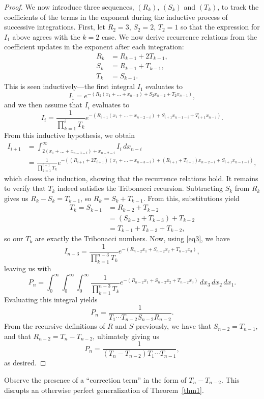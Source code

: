 \documentclass{amsart}
\begin{document}
\begin{proof}
  We now introduce three sequences, $(R_k)$, $(S_k)$ and $(T_k)$, to track the coefficients of the terms in the exponent during the inductive process of successive integrations. First, let $R_2=3$, $S_2=2$, $T_2=1$ so that the expression for $I_1$ above agrees with the $k=2$ case. We now derive recurrence relations from the coefficient updates in the exponent after each integration:
  \begin{align*}
    R_{k} &= R_{k-1} + 2T_{k-1}, \\
    S_k &= R_{k-1} + T_{k-1}, \\
    T_{k} &= S_{k-1}.
  \end{align*}
  This is seen inductively---the first integral $I_1$ evaluates to \[
    I_1 = e^{-(R_2(x_1 + \dots + x_{n-3}) + S_2 x_{n-2} + T_2 x_{n-1})},
  \] and we then assume that $I_i$ evaluates to
  \begin{equation} \label{eq3}
    I_i = \frac{1}{\prod_{k=1}^{i} T_k} e^{-(R_{i+1}(x_1 + \dots + x_{n-2-i}) + S_{i+1} x_{n-1-i} + T_{i+1}x_{n-i})}.
  \end{equation}
  From this inductive hypothesis, we obtain
  \begin{align*}
    I_{i+1} &= \int_{2(x_1+\dots+x_{n-3-i}) + x_{n-2-i}}^{\infty} I_i\, dx_{n-i} \\
            &= \frac{1}{\prod_{k=1}^{i+1} T_k} e^{-((R_{i+1} + 2T_{i+1})(x_1 + \dots + x_{n-3-i}) + (R_{i+1} + T_{i+1})x_{n-2-i} + S_{i+1}x_{n-1-i})},
  \end{align*}
  which closes the induction, showing that the recurrence relations hold. It remains to verify that $T_k$ indeed satisfies the Tribonacci recursion. Subtracting $S_k$ from $R_k$ gives us $R_k - S_k = T_{k-1}$, so $R_k = S_k + T_{k-1}$. From this, substitutions yield 
  \begin{align*}
    T_k = S_{k-1} &= R_{k-2} + T_{k-2} \\
                  &= (S_{k-2} + T_{k-3}) + T_{k-2} \\
                  &= T_{k-1} + T_{k-3} + T_{k-2},
  \end{align*}
  so our $T_k$ are exactly the Tribonacci numbers. Now, using \eqref{eq3}, we have \[
    I_{n-3} = \frac{1}{\prod_{k = 1}^{n-3} T_k} e^{-(R_{n-2}x_1 + S_{n-2}x_2 + T_{n-2}x_3)}
  ,\] leaving us with
  \begin{equation*}
    P_n = \int_{0}^{\infty} \int_{0}^{\infty} \int_{0}^{\infty} \frac{1}{\prod_{k = 1}^{n-3} T_k} e^{-(R_{n-2}x_1 + S_{n-2}x_2 + T_{n-2}x_3)} \, dx_3\, dx_2\, dx_1.
  \end{equation*}
  Evaluating this integral yields \[
    P_n = \frac{1}{T_1 \cdots T_{n-2} S_{n-2} R_{n-2}}
    .\] From the recursive definitions of $R$ and $S$ previously, we have that $S_{n-2} = T_{n-1}$, and that $R_{n-2} = T_{n} - T_{n-2}$, ultimately giving us \[
    P_n = \frac{1}{(T_n - T_{n-2})T_1\cdots T_{n-1}}
  ,\] as desired.
\end{proof}
Observe the presence of a ``correction term'' in the form of $T_n - T_{n-2}$. This disrupts an otherwise perfect generalization of Theorem~\ref{thm1}.
\end{document}
